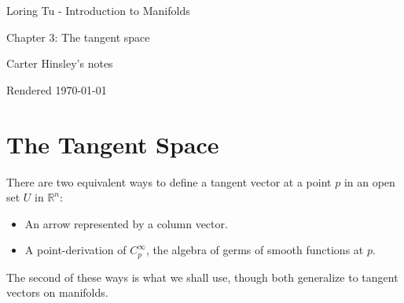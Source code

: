 \documentclass[a4paper]{article}
\newcommand{\R}{\mathbb{R}}
\begin{document}
\begin{center}
\LARGE{Loring Tu - Introduction to Manifolds}

\Large{Chapter 3: The tangent space}

\large{Carter Hinsley's notes}

Rendered \today
\end{center}

\setcounter{section}{7}
\section{The Tangent Space}

There are two equivalent ways to define a tangent vector at a point $p$ in an open set $U$ in $\R^n$:

\begin{itemize}
    \item An arrow represented by a column vector.
    \item A point-derivation of $C_p^\infty$, the algebra of germs of smooth functions at $p$.
\end{itemize}

\noindent The second of these ways is what we shall use, though both generalize to tangent vectors on manifolds.
\end{document}
